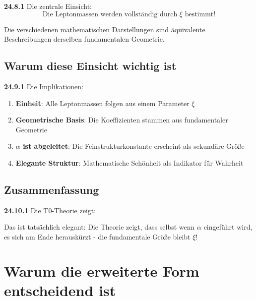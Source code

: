 \documentclass[12pt,a4paper]{article}
\begin{document}
\noindent \textbf{24.8.1} Die zentrale Einsicht:
\[
\boxed{
	\text{Die Leptonmassen werden vollständig durch } \xi \text{ bestimmt!}
}
\]

Die verschiedenen mathematischen Darstellungen sind äquivalente Beschreibungen derselben fundamentalen Geometrie.

\subsection{Warum diese Einsicht wichtig ist}

\noindent \textbf{24.9.1} Die Implikationen:
\begin{enumerate}
	\item \textbf{Einheit}: Alle Leptonmassen folgen aus einem Parameter $\xi$
	\item \textbf{Geometrische Basis}: Die Koeffizienten stammen aus fundamentaler Geometrie
	\item \textbf{$\alpha$ ist abgeleitet}: Die Feinstrukturkonstante erscheint als sekundäre Größe
	\item \textbf{Elegante Struktur}: Mathematische Schönheit als Indikator für Wahrheit
\end{enumerate}

\subsection{Zusammenfassung}

\noindent \textbf{24.10.1} Die T0-Theorie zeigt:
\begin{center}
\end{center}

Das ist tatsächlich elegant: Die Theorie zeigt, dass selbst wenn $\alpha$ eingeführt wird, es sich am Ende herauskürzt - die fundamentale Größe bleibt $\xi$!


\section{Warum die erweiterte Form entscheidend ist}
\end{document}
